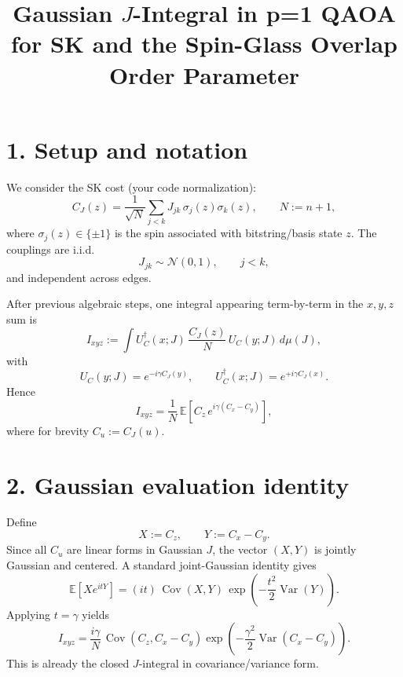 \documentclass[11pt]{article}
\title{Gaussian $J$-Integral in p=1 QAOA for SK and the Spin-Glass Overlap Order Parameter}
\author{}
\date{}
\newcommand{\E}{\mathbb{E}}
\DeclareMathOperator{\Cov}{Cov}
\DeclareMathOperator{\Var}{Var}
\begin{document}
	\maketitle
	
	\section*{1. Setup and notation}
	We consider the SK cost (your code normalization):
	\begin{equation}
		C_J(z)
		=
		\frac{1}{\sqrt{N}}
		\sum_{j<k} J_{jk}\,\sigma_j(z)\sigma_k(z),
		\qquad N:=n+1,
		\label{eq:CJ}
	\end{equation}
	where $\sigma_j(z)\in\{\pm 1\}$ is the spin associated with bitstring/basis state $z$.
	The couplings are i.i.d.
	\begin{equation}
		J_{jk}\sim\mathcal N(0,1),\qquad j<k,
		\label{eq:J-gaussian}
	\end{equation}
	and independent across edges.
	
	After previous algebraic steps, one integral appearing term-by-term in the $x,y,z$ sum is
	\begin{equation}
		I_{xyz}
		:=
		\int U_C^\dagger(x;J)\,\frac{C_J(z)}{N}\,U_C(y;J)\,d\mu(J),
		\label{eq:Ixyz-def}
	\end{equation}
	with
	\begin{equation}
		U_C(y;J)=e^{-i\gamma C_J(y)},\qquad
		U_C^\dagger(x;J)=e^{+i\gamma C_J(x)}.
	\end{equation}
	Hence
	\begin{equation}
		I_{xyz}
		=
		\frac{1}{N}\,\E\!\left[C_z\,e^{i\gamma(C_x-C_y)}\right],
		\label{eq:Ixyz-mgf-form}
	\end{equation}
	where for brevity $C_u:=C_J(u)$.
	
	\section*{2. Gaussian evaluation identity}
	Define
	\begin{equation}
		X:=C_z,\qquad Y:=C_x-C_y.
	\end{equation}
	Since all $C_u$ are linear forms in Gaussian $J$, the vector $(X,Y)$ is jointly Gaussian and centered.
	A standard joint-Gaussian identity gives
	\begin{equation}
		\E\!\left[X e^{itY}\right]
		=
		(it)\,\Cov(X,Y)\,\exp\!\left(-\frac{t^2}{2}\Var(Y)\right).
		\label{eq:gaussian-identity}
	\end{equation}
	Applying $t=\gamma$ yields
	\begin{equation}
		I_{xyz}
		=
		\frac{i\gamma}{N}\,\Cov(C_z, C_x-C_y)
		\exp\!\left(-\frac{\gamma^2}{2}\Var(C_x-C_y)\right).
		\label{eq:Ixyz-cov-var}
	\end{equation}
	This is already the closed $J$-integral in covariance/variance form.
	
\end{document}
